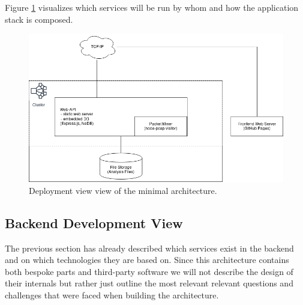 Figure \ref{fig:deploymentviewmvp} visualizes which services will be run by whom and how the application stack is composed.

\begin{figure}
    \centering
    \includegraphics[width=16cm]{images/deploymentviewmvp.png}
    \caption{Deployment view view of the minimal architecture.}
    \label{fig:deploymentviewmvp}
\end{figure}

\subsection{Backend Development View}
The previous section has already described which services exist in the backend and on which technologies they are based on. Since this architecture contains both bespoke parts and third-party software we will not describe the design of their internals but rather just outline the most relevant relevant questions and challenges that were faced when building the architecture.


